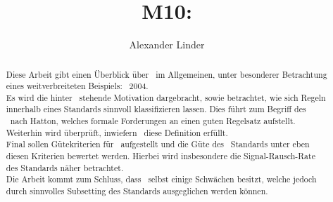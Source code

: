 \documentclass[a4paper,UKenglish,cleveref, autoref]{templates/lipics-v2019}
\title{M10: \sqss}
\author{Alexander Linder}{Karlsruhe Institute of Technology, Germany \and \url{https://kit.edu} }{alexander.linder@student.kit.edu}{}{}
\begin{document}
    \maketitle

    \begin{abstract}
        Diese Arbeit gibt einen Überblick über \sqss\ im Allgemeinen, unter besonderer Betrachtung eines weitverbreiteten Beispiels: \misra\ 2004.\\
        Es wird die hinter \sqss\ stehende Motivation dargebracht, sowie betrachtet, wie sich Regeln innerhalb eines Standards sinnvoll klassifizieren lassen.
        Dies führt zum Begriff des \slss\ nach Hatton, welches formale Forderungen an einen guten Regelsatz aufstellt.
        Weiterhin wird überprüft, inwiefern \misra\ diese Definition erfüllt.\\
        Final sollen Gütekriterien für \sqss\ aufgestellt und die Güte des \misra\ Standards unter eben diesen Kriterien bewertet werden.
        Hierbei wird insbesondere die Signal-Rausch-Rate des Standards näher betrachtet.\\
        Die Arbeit kommt zum Schluss, dass \misra\ selbst einige Schwächen besitzt, welche jedoch durch sinnvolles Subsetting
        des Standards ausgeglichen werden können.
    \end{abstract}
\end{document}

